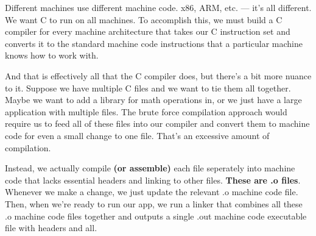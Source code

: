 \documentclass[12pt]{article}
\begin{document}
Different machines use different machine code. x86, ARM, etc. — it's all different. We want C to run on all machines. To accomplish this, we must build a C compiler for every machine architecture that takes our C instruction set and converts it to the standard machine code instructions that a particular machine knows how to work with.

\begin{center}
\end{center}

And that is effectively all that the C compiler does, but there's a bit more nuance to it. Suppose we have multiple C files and we want to tie them all together. Maybe we want to add a library for math operations in, or we just have a large application with multiple files. The brute force compilation approach would require us to feed all of these files into our compiler and convert them to machine code for even a small change to one file. That's an excessive amount of compilation.

Instead, we actually compile \textbf{(or assemble)} each file seperately into machine code that lacks essential headers and linking to other files. \textbf{These are .o files}. Whenever we make a change, we just update the relevant .o machine code file. Then, when we're ready to run our app, we run a linker that combines all these .o machine code files together and outputs a single .out machine code executable file with headers and all.
\end{document}
